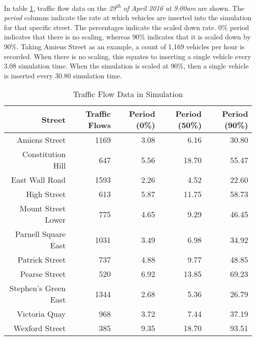 In table \ref{table:data_trafficFlow}, traffic flow data on the \textit{29\textsuperscript{th} of April 2016 at 9:00am} are shown. The \textit{period} columns indicate the rate at which vehicles are inserted into the simulation for that specific street. The percentages indicate the scaled down rate. 0\% period indicates that there is no scaling, whereas 90\% indicates that it is scaled down by 90\%. Taking Amiens Street as an example, a count of 1,169 vehicles per hour is recorded. When there is no scaling, this equates to inserting a single vehicle every 3.08 simulation time. When the simulation is scaled at 90\%, then a single vehicle is inserted every 30.80 simulation time.
\begin{table}[H]
    \begin{center}
        \begin{tabular}{|r|r|r|r|r|}
            \hline
            Street & Traffic Flows & Period (0\%) & Period (50\%) & Period (90\%) \\
            \hline\hline
            Amiens Street & 1169 & 3.08 & 6.16 & 30.80 \\ \hline
            Constitution Hill & 647 & 5.56 & 18.70 & 55.47 \\ \hline
            East Wall Road & 1593 & 2.26 & 4.52 & 22.60 \\ \hline
            High Street & 613 & 5.87 & 11.75 & 58.73 \\ \hline
            Mount Street Lower & 775 & 4.65 & 9.29 & 46.45 \\ \hline
            Parnell Square East & 1031 & 3.49 & 6.98 & 34.92 \\ \hline
            Patrick Street & 737 & 4.88 & 9.77 & 48.85 \\ \hline
            Pearse Street & 520 & 6.92 & 13.85 & 69.23 \\ \hline
            Stephen's Green East & 1344 & 2.68 & 5.36 & 26.79 \\ \hline
            Victoria Quay & 968 & 3.72 & 7.44 & 37.19 \\ \hline
            Wexford Street & 385 & 9.35 & 18.70 & 93.51 \\ \hline
        \end{tabular}
        \caption{Traffic Flow Data in Simulation}
        \label{table:data_trafficFlow} 
    \end{center}
\end{table}